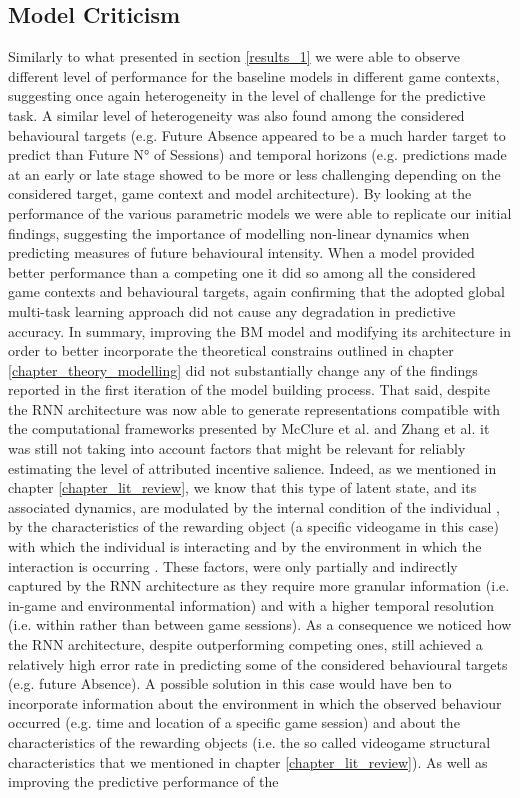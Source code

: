 \subsection{Model Criticism}
\label{model_criticims_2}
Similarly to what presented in section \ref{results_1} we were able to observe different level of performance for the baseline models in different game contexts, suggesting once again heterogeneity in the level of challenge for the predictive task. A similar level of heterogeneity was also found among the considered behavioural targets (e.g. Future Absence appeared to be a much harder target to predict than Future N° of Sessions) and temporal horizons (e.g. predictions made at an early or late stage showed to be more or less challenging depending on the considered target, game context and model architecture). By looking at the performance of the various parametric models we were able to replicate our initial findings, suggesting the importance of modelling non-linear dynamics when predicting measures of future behavioural intensity. When a model provided better performance than a competing one it did so among all the considered game contexts and behavioural targets, again confirming that the adopted global multi-task learning approach did not cause any degradation in predictive accuracy. In summary, improving the BM model and modifying its architecture in order to better incorporate the theoretical constrains outlined in chapter \ref{chapter_theory_modelling} did not substantially change any of the findings reported in the first iteration of the model building process. That said, despite the RNN architecture was now able to generate representations compatible with the computational frameworks presented by McClure et al. \cite{mcclure2003computational} and Zhang et al. \cite{zhang2009neural} it was still not taking into account factors that might be relevant for reliably estimating the level of attributed incentive salience. Indeed, as we mentioned in chapter \ref{chapter_lit_review}, we know that this type of latent state, and its associated dynamics, are modulated by the internal condition of the individual \cite{zhang2009neural}, by the characteristics of the rewarding object (a specific videogame in this case) with which the individual is interacting and by the environment in which the interaction is occurring \cite{palminteri2015contextual}. These factors, were only partially and indirectly captured by the RNN architecture as they require more granular information (i.e. in-game and environmental information) and with a higher temporal resolution (i.e. within rather than between game sessions). As a consequence we noticed how the RNN architecture, despite outperforming competing ones, still achieved a relatively high error rate in predicting some of the considered behavioural targets (e.g. future Absence). A possible solution in this case would have ben to incorporate information about the environment in which the observed behaviour occurred (e.g. time and location of a specific game session) and about the characteristics of the rewarding objects (i.e. the so called videogame structural characteristics that we mentioned in chapter \ref{chapter_lit_review}). As well as improving the predictive performance of the 